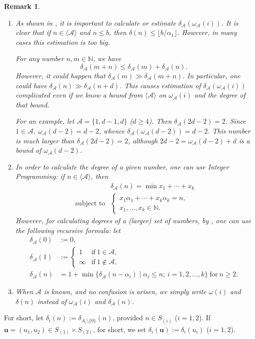 \documentclass[11pt]{article}
\newtheorem{Remark}[Theorem]{Remark}
\def\ubf{{\mathbf u}}
\def\Acal{{\mathcal A}}
\def\Nset{{\mathbb N}}
\theoremstyle{remark}
\theoremstyle{definition}
\begin{document}
\begin{Remark}\label{degree} 
\begin{enumerate}[\(1)\)]
    \item As shown in \cite{Br, FH}, it is important to calculate or estimate  $\delta_{\Acal} (\omega_{\Acal}(i)) $. It is clear that if $n\in \langle \Acal \rangle$ and $n\leq b$, then $\delta(n) \leq \lfloor b/\alpha_1\rfloor $. However, in many cases this estimation is too big.

For any number $n,m \in \Nset$, we have
$$\delta_{\Acal} (m+n)  \le \delta_{\Acal} (m) + \delta_{\Acal} (n).$$
However, it could happen that $ \delta_{\Acal} (m) \gg \delta_{\Acal} (m+n) $. In particular, one could have  $\delta_{\Acal} (n) \gg \delta_{\Acal} (n+d)$. This causes estimation of $\delta_{\Acal} (\omega_{\Acal}(i)) $ complicated even if we know a bound from $\langle \Acal\rangle$ on $\omega_{\Acal}(i)$ and the degree of that  bound.

For an example, let $\Acal =\{1, d-1, d\}$ ($d\geq 4$). Then $\delta_\Acal(2d-2) = 2$. Since $1\in \Acal$,  $\omega_{\Acal}(d-2) = d-2$, whence $\delta_{\Acal} (\omega_\Acal(d-2)) = d-2$. This number is  much larger than $\delta_\Acal(2d-2) = 2$, although $2d - 2 = \omega_{\Acal}(d-2) +d$ is a bound of $\omega_{\Acal}(d-2)$.
\item In order to calculate the degree of a given number, one can use Integer Programming: if $n\in \langle \Acal \rangle$, then 
$$\begin{array}{cc}
& \delta_{\Acal}(n) =  \min x_1 + \cdots +  x_k       \\
\text{ subject  to}      &
\begin{cases}
x_1\alpha_1 + \cdots + x_{k}\alpha_{k} = n,\\
x_1,\ldots,x_k  \in \Nset.
\end{cases}
\end{array}$$ 
However, for calculating degrees of a (larger) set of numbers, by \cite[Remark 2]{FH},  one can use the following recursive formula: let
$$\begin{array}{ll}
\delta_{\Acal}(0 ) & := 0, \\
\delta_{\Acal}(1 ) & :=  \begin{cases} 1 & \text{if} \ 1\in \Acal, \\
\infty  & \text{if} \  1\not\in \Acal, 
\end{cases}\\
\delta_{\Acal} (n)&  = 1 +  \min\{ \delta_{\Acal}(n-\alpha_i) \mid \alpha_i \le n;\  i=1,2,\ldots,k\} \ \text{for} \ n\geq 2.
\end{array}$$ 
\item When $\Acal$ is known, and no confusion is arisen, we simply write $\omega(i)$ and $\delta(n)$ instead of $\omega_\Acal(i)$ and $\delta_\Acal(n)$.
\end{enumerate}
\end{Remark}
For short, let $\delta_i(n) := \delta_{A_i \setminus \{0\}}(n)$, provided $n\in S_{(i)}$ ($i=1,2$).  If $\ubf = (u_1,u_2) \in S_{(1)} \times S_{(2)}$, for short, we set $\delta_i (\ubf) := \delta_i(u_i)$ ($i=1,2$). 
\end{document}
